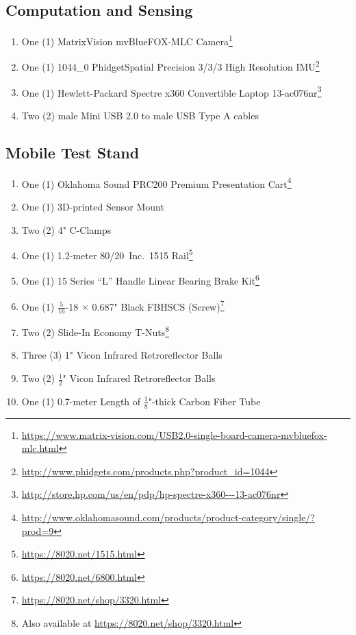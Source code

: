 \subsection{Computation and Sensing}
\begin{enumerate}
\item One (1) MatrixVision mvBlueFOX-MLC Camera\footnote{\url{https://www.matrix-vision.com/USB2.0-single-board-camera-mvbluefox-mlc.html}}
\item One (1) 1044\_0 PhidgetSpatial Precision 3/3/3 High Resolution IMU\footnote{\url{http://www.phidgets.com/products.php?product_id=1044}}
\item One (1) Hewlett-Packard Spectre x360 Convertible Laptop 13-ac076nr\footnote{\url{http://store.hp.com/us/en/pdp/hp-spectre-x360---13-ac076nr}}
\item Two (2) male Mini USB 2.0 to male USB Type A cables
\end{enumerate}
\subsection{Mobile Test Stand}
\begin{enumerate}
\item One (1) Oklahoma Sound PRC200 Premium Presentation Cart\footnote{\url{http://www.oklahomasound.com/products/product-category/single/?prod=9}}
\item One (1) 3D-printed Sensor Mount
\item Two (2) 4" C-Clamps
\item One (1) 1.2-meter 80/20\textsuperscript{\textregistered}~Inc.\ 1515 Rail\footnote{\url{https://8020.net/1515.html}}
\item One (1) 15 Series ``L'' Handle Linear Bearing Brake Kit\footnote{\url{https://8020.net/6800.html}}
\item One (1) $\frac{5}{16}$-18 $\times$ 0.687" Black FBHSCS (Screw)\footnote{\url{https://8020.net/shop/3320.html}}
\item Two (2) Slide-In Economy T-Nuts\footnote{Also available at \url{https://8020.net/shop/3320.html}}
\item Three (3) 1" Vicon Infrared Retroreflector Balls
\item Two (2) $\frac{1}{2}$" Vicon Infrared Retroreflector Balls
\item One (1) 0.7-meter Length of $\frac{1}{8}$"-thick Carbon Fiber Tube
\end{enumerate}
\pagebreak

